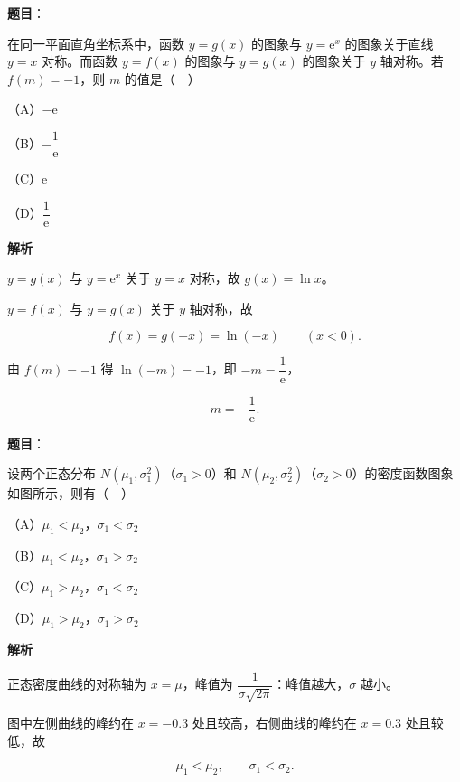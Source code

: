 \begin{answer}

\textbf{题目}：

在同一平面直角坐标系中，函数 $y=g(x)$ 的图象与 $y=\mathrm e^x$ 的图象关于直线 $y=x$ 对称。而函数 $y=f(x)$ 的图象与 $y=g(x)$ 的图象关于 $y$ 轴对称。若 $f(m)=-1$，则 $m$ 的值是（　）

（A）$-\mathrm e$

（B）$-\dfrac1{\mathrm e}$

（C）$\mathrm e$

（D）$\dfrac1{\mathrm e}$

\textbf{解析}

$y=g(x)$ 与 $y=\mathrm e^x$ 关于 $y=x$ 对称，故 $g(x)=\ln x$。

$y=f(x)$ 与 $y=g(x)$ 关于 $y$ 轴对称，故

\nopagebreak[4]
\[f(x)=g(-x)=\ln(-x)\qquad(x<0).\]

由 $f(m)=-1$ 得 $\ln(-m)=-1$，即 $-m=\dfrac1{\mathrm e}$，

\nopagebreak[4]
\[m=-\frac1{\mathrm e}.\]


\end{answer}
\begin{answer}

\textbf{题目}：

设两个正态分布 $N(\mu_1,\sigma_1^2)$（$\sigma_1>0$）和 $N(\mu_2,\sigma_2^2)$（$\sigma_2>0$）的密度函数图象如图所示，则有（　）
\nopagebreak[4]
\begin{center}\end{center}
\nopagebreak[4]
（A）$\mu_1<\mu_2$，$\sigma_1<\sigma_2$

（B）$\mu_1<\mu_2$，$\sigma_1>\sigma_2$

（C）$\mu_1>\mu_2$，$\sigma_1<\sigma_2$

（D）$\mu_1>\mu_2$，$\sigma_1>\sigma_2$

\textbf{解析}

正态密度曲线的对称轴为 $x=\mu$，峰值为 $\dfrac1{\sigma\sqrt{2\pi}}$：峰值越大，$\sigma$ 越小。

图中左侧曲线的峰约在 $x=-0.3$ 处且较高，右侧曲线的峰约在 $x=0.3$ 处且较低，故

\nopagebreak[4]
\[\mu_1<\mu_2,\qquad \sigma_1<\sigma_2.\]


\end{answer}
